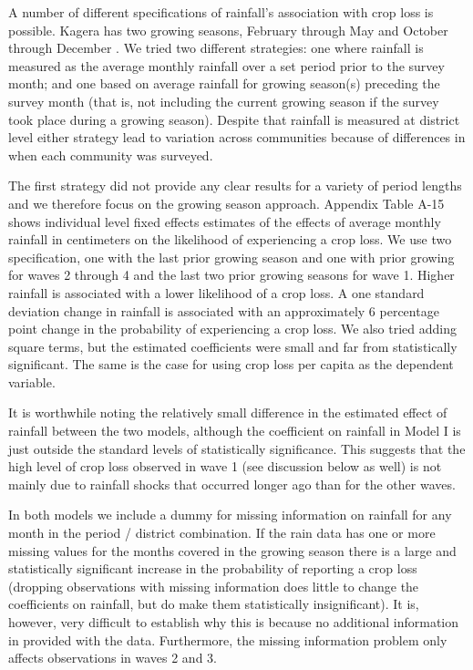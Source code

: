 \documentclass[letterpaper,12pt]{article}
\begin{document}
\begin{enumerate}
A number of different specifications of rainfall's association with 
crop loss is possible.
Kagera has two growing seasons, February through May and
October through December \citep[p 6]{Tanzania2007}.
We tried two different strategies: 
one where rainfall is measured as the average monthly rainfall 
over a set period prior to the survey month; 
and one based on average rainfall for growing season(s) preceding 
the survey month 
(that is, not including the current growing season if the survey
took place during a growing season).
Despite that rainfall is measured at district level either strategy
lead to variation across communities because of differences in 
when each community was surveyed.

The first strategy did not provide any clear results for a variety
of period lengths and we therefore focus on the growing season approach.
Appendix Table A-15 shows individual level fixed effects estimates of the 
effects of average monthly rainfall in centimeters on the likelihood
of experiencing a crop loss.
We use two specification, one with the last prior growing season and 
one with prior growing for waves 2 through 4 and the last two prior 
growing seasons for wave 1.
Higher rainfall is associated with a lower likelihood of a crop loss. 
A one standard deviation change in rainfall is associated with an
approximately 6 percentage point change in the probability of 
experiencing a crop loss.
We also tried adding square terms, but the estimated coefficients
were small and far from statistically significant.
The same is the case for using crop loss per capita as the dependent
variable. 

It is worthwhile noting the relatively small difference in the 
estimated effect of rainfall between the two models, 
although the coefficient on rainfall in Model I is just outside
the standard levels of statistically significance.
This suggests that the high level of crop loss observed in
wave 1 (see discussion below as well) is not mainly due to 
rainfall shocks that occurred longer ago than for the other waves.

In both models we include a dummy for missing information on rainfall 
for any month in the period / district combination.
If the rain data has one or more missing values for the months
covered in the growing season there is a large and statistically 
significant increase in the probability of reporting a crop loss
(dropping observations with missing information does little
to change the coefficients on rainfall, but do make them
statistically insignificant).
It is, however, very difficult to establish why this is because
no additional information in provided with the data.
Furthermore, the missing information problem only affects
observations in waves 2 and 3.


\end{enumerate}
\end{document}
